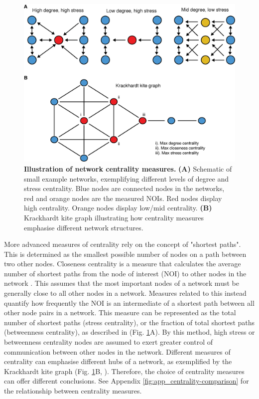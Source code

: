\begin{figure}[htbp]
    \centering
    \includegraphics[width=\textwidth,height=\textheight,keepaspectratio]{figures/chapter1/ch1_centrality.png}
    \caption[{Illustration of network centrality measures.}]
    {\textbf{Illustration of network centrality measures.} 
    \textbf{(A)} Schematic of small example networks, exemplifying different levels of degree and stress centrality. Blue nodes are connected nodes in the networks, red and orange nodes are the measured NOIs. Red nodes display high centrality. Orange nodes display low/mid centrality. 
    \textbf{(B)} Krackhardt kite graph \citep{krackhardt_assessing_1990} illustrating how centrality measures emphasise different network structures.
    }
    \label{fig:ch1_stress-example}
\end{figure}

More advanced measures of centrality rely on the concept of "shortest paths". This is determined as the smallest possible number of nodes on a path between two other nodes. Closeness centrality is a measure that calculates the average number of shortest paths from the node of interest (NOI) to other nodes in the network \citep{bavelas_communication_1950}. This assumes that the most important nodes of a network must be generally close to all other nodes in a network. Measures related to this instead quantify how frequently the NOI is an intermediate of a shortest path between all other node pairs in a network. This measure can be represented as the total number of shortest paths (stress centrality), or the fraction of total shortest paths (betweenness centrality), as described in \cite{freeman_set_1977} (Fig. \ref{fig:ch1_stress-example}A). By this method, high stress or betweenness centrality nodes are assumed to exert greater control of communication between other nodes in the network. Different measures of centrality can emphasise different hubs of a network, as exemplified by the Krackhardt kite graph (Fig. \ref{fig:ch1_stress-example}B, \cite{krackhardt_assessing_1990}). Therefore, the choice of centrality measures can offer different conclusions. See Appendix \ref{fig:app_centrality-comparison} for the relationship between centrality measures.


